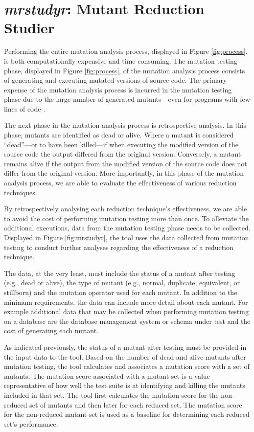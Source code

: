 

\section{\textit{mrstudyr}: Mutant Reduction Studier}

Performing the entire mutation analysis process, displayed in Figure \ref{fig:process},
is both computationally expensive and time consuming. The mutation testing
phase, displayed in Figure \ref{fig:process}, of the mutation analysis
process consists of generating and executing mutated versions of source code. The primary
expense of the mutation analysis process is incurred in the mutation testing phase
due to the large number of generated mutants---even for programs with few lines of code \cite{offutt2001mutation}.

The next phase in the mutation analysis process is retrospective analysis. In this
phase, mutants are identified as dead or alive. Where a mutant is considered
``dead''---or to have been killed---if when executing the modified version of the source
code the output differed from the original version. Conversely, a mutant remains alive
if the output from the modified version of the source code does not differ from the
original version. More importantly, in this phase of the mutation analysis process,
we are able to evaluate the effectiveness of various reduction techniques.

By retrospectively analysing each reduction technique's effectiveness, we are
able to avoid the cost of performing mutation testing more than once. To alleviate
the additional executions, data from the mutation testing phase needs to be collected.
Displayed in Figure \ref{fig:mrstudyr},
the \mr tool uses the data collected from mutation testing to conduct further analyses
regarding the effectiveness of a reduction technique.

The data, at the very least, must  include the status of
a mutant after testing (e.g., dead or alive), the type of mutant (e.g., normal, duplicate, equivalent, or stillborn)
and the mutation operator used for each mutant. In addition to the minimum requirements, the data can include
more detail about each mutant. For example additional data that may be collected when performing mutation testing
on a database are the database
management system or schema under test and the cost of generating each mutant.

As indicated previously, the status of a mutant after testing must be provided
in the input data to the \mr tool.
Based on the number of dead and alive mutants after mutation testing,
the \mr tool calculates and associates a mutation score with a set of mutants.
The mutation score associated with a mutant set is a value representative of how well
the test suite is at identifying and killing the mutants included in that set.
The \mr tool first calculates the
mutation score for the non-reduced set of mutants and then later for each reduced set. The mutation
score for the non-reduced mutant set is used as a baseline for determining
each reduced set's performance.


